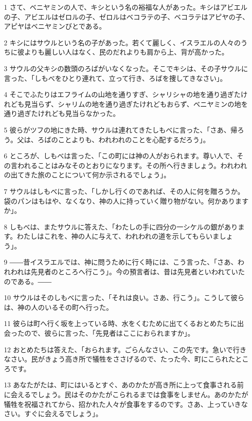 \par 1 さて、ベニヤミンの人で、キシという名の裕福な人があった。キシはアビエルの子、アビエルはゼロルの子、ゼロルはベコラテの子、ベコラテはアピヤの子、アピヤはベニヤミンびとである。
\par 2 キシにはサウルという名の子があった。若くて麗しく、イスラエルの人々のうちに彼よりも麗しい人はなく、民のだれよりも肩から上、背が高かった。
\par 3 サウルの父キシの数頭のろばがいなくなった。そこでキシは、その子サウルに言った、「しもべをひとり連れて、立って行き、ろばを捜してきなさい」。
\par 4 そこでふたりはエフライムの山地を通りすぎ、シャリシャの地を通り過ぎたけれども見当らず、シャリムの地を通り過ぎたけれどもおらず、ベニヤミンの地を通り過ぎたけれども見当らなかった。
\par 5 彼らがツフの地にきた時、サウルは連れてきたしもべに言った、「さあ、帰ろう。父は、ろばのことよりも、われわれのことを心配するだろう」。
\par 6 ところが、しもべは言った、「この町には神の人がおられます。尊い人で、その言われることはみなそのとおりになります。その所へ行きましょう。われわれの出てきた旅のことについて何か示されるでしょう」。
\par 7 サウルはしもべに言った、「しかし行くのであれば、その人に何を贈ろうか。袋のパンはもはや、なくなり、神の人に持っていく贈り物がない。何かありますか」。
\par 8 しもべは、またサウルに答えた、「わたしの手に四分の一シケルの銀があります。わたしはこれを、神の人に与えて、われわれの道を示してもらいましょう」。
\par 9 ――昔イスラエルでは、神に問うために行く時には、こう言った、「さあ、われわれは先見者のところへ行こう」。今の預言者は、昔は先見者といわれていたのである。――
\par 10 サウルはそのしもべに言った、「それは良い。さあ、行こう」。こうして彼らは、神の人のいるその町へ行った。
\par 11 彼らは町へ行く坂を上っている時、水をくむために出てくるおとめたちに出会ったので、彼らに言った、「先見者はここにおられますか」。
\par 12 おとめたちは答えた、「おられます。ごらんなさい、この先です。急いで行きなさい。民がきょう高き所で犠牲をささげるので、たった今、町にこられたところです。
\par 13 あなたがたは、町にはいるとすぐ、あのかたが高き所に上って食事される前に会えるでしょう。民はそのかたがこられるまでは食事をしません。あのかたが犠牲を祝福されてから、招かれた人々が食事をするのです。さあ、上っていきなさい。すぐに会えるでしょう」。
